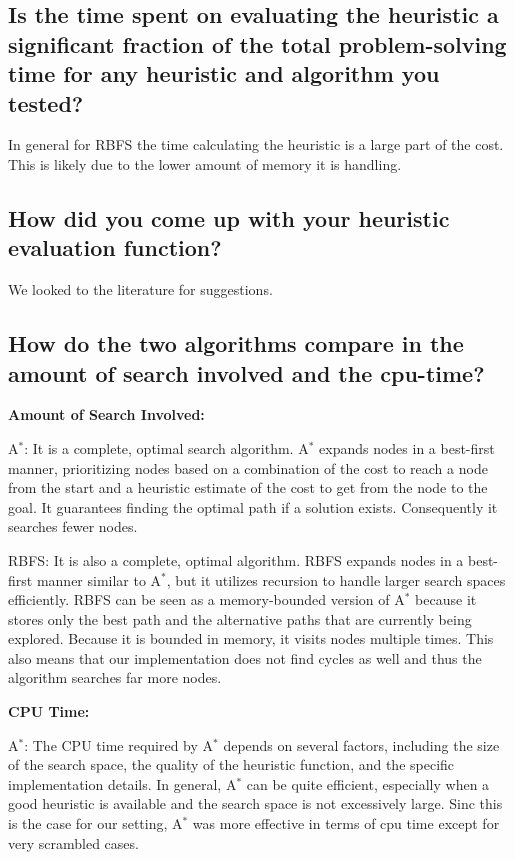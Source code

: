 \documentclass{article}
\begin{document}
\subsection{ Is the time spent on evaluating the heuristic a significant fraction of the total problem-solving time for any heuristic and algorithm you tested?} In general for RBFS the time calculating the heuristic is a large part of the cost. This is likely due to the lower amount of memory it is handling. 
\subsection{ How did you come up with your heuristic evaluation function?}

{We looked to the literature for suggestions. }

\subsection{ How do the two algorithms compare in the amount of search involved and the cpu-time?}

\textbf{Amount of Search Involved: }

 A$^*$: It is a complete, optimal search algorithm. A$^*$ expands nodes in a best-first manner, prioritizing nodes based on a combination of the cost to reach a node from the start and a heuristic estimate of the cost to get from the node to the goal. It guarantees finding the optimal path if a solution exists. Consequently it searches fewer nodes.

 RBFS: It is also a complete, optimal algorithm. RBFS expands nodes in a best-first manner similar to A$^*$, but it utilizes recursion to handle larger search spaces efficiently. RBFS can be seen as a memory-bounded version of A$^*$ because it stores only the best path and the alternative paths that are currently being explored. Because it is bounded in memory, it visits nodes multiple times. This also means that our implementation does not find cycles as well and thus the algorithm searches far more nodes.

\textbf{CPU Time:}

 A$^*$: The CPU time required by A$^*$ depends on several factors, including the size of the search space, the quality of the heuristic function, and the specific implementation details. In general, A$^*$ can be quite efficient, especially when a good heuristic is available and the search space is not excessively large. Sinc this is the case for our setting, A$^*$ was more effective in terms of cpu time except for very scrambled cases. 
\end{document}
